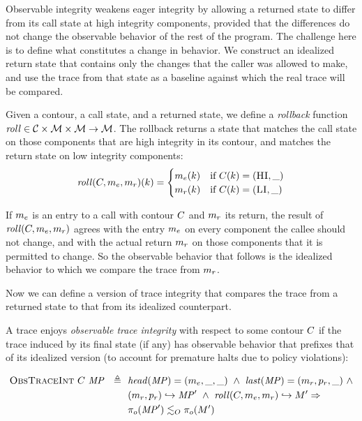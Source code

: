 \documentclass[acmsmall,review,anonymous]{acmart}\settopmatter{printfolios=true,printccs=false,printacmref=false}
\begin{document}
{Observable integrity weakens eager integrity by allowing a returned
state to differ from its call state at high integrity components,
provided that the differences do not change the observable behavior of
the rest of the program. The challenge here is to define what constitutes
a change in behavior. We construct an idealized return state that
contains only the changes that the caller was allowed to make, and use
the trace from that state as a baseline against which the real trace
will be compared.


      Given a contour, a call state, and a returned state, we define a
      {\em rollback} function \(\mathit{roll} \in {\mathcal C} \times {\mathcal M} \times
      {\mathcal M} \rightarrow {\mathcal M}\). The rollback returns a state that matches
      the call state on those components that are high integrity in its
      contour, and matches the return state on low integrity components:
      \[\mathit{roll}(C,m_e,m_r)(k) =
      \begin{cases}
        m_e(k) & \text{if } C(k) = (\textsc{HI},\_) \\
        m_r(k) & \text{if } C(k) = (\textsc{LI},\_) \\
      \end{cases}\]

      If \(m_e\) is an entry to a call with contour \(C\)
      and \(m_r\) its return, the result of
      \(\mathit{roll}(C,m_e,m_r)\) agrees with the
      entry \(m_e\) on every component the callee should not
      change, and with the actual return \(m_r\) on those
      components that it is permitted to change.  So the observable
      behavior that follows is the idealized behavior to which we
      compare the trace from \(m_r\).

      Now we can define a version of trace integrity that compares the trace
      from a returned state to that from its idealized counterpart.


      A trace enjoys {\em observable trace integrity} with respect to
      some contour \(C\) if the trace induced by its final
      state (if any) has observable behavior that prefixes that of its
      idealized version (to account for premature halts due to policy
      violations):

      \[\begin{split}
        \text{\sc ObsTraceInt} ~ C ~ \mathit{MP} \ \ \triangleq \ \
        & \mathit{head}(\mathit{MP}) = (m_e,\_,\_) ~ \land ~
          \mathit{last}(\mathit{MP}) = (m_r,p_r,\_) ~ \land \\
        & (m_r,p_r) \hookrightarrow \mathit{MP}' ~ \land ~
          \mathit{roll}(C,m_e,m_r) \hookrightarrow M'
          \Rightarrow \\
        & \pi_o(\mathit{MP}') \lesssim_O \pi_o(M')
      \end{split}\]

}
\end{document}
